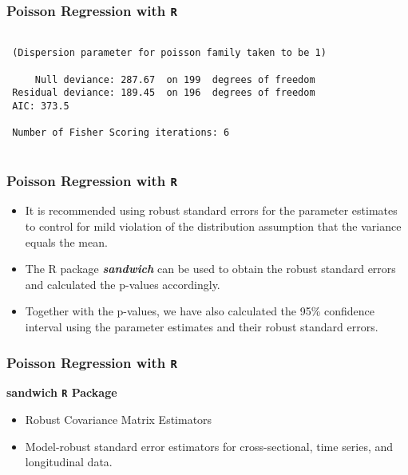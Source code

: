 \documentclass[00-GLMregslides.tex]{subfiles}
\begin{document}
\begin{frame}[fragile]

\frametitle{Poisson Regression with \texttt{R}}
\large
\begin{framed}
\begin{verbatim}

 (Dispersion parameter for poisson family taken to be 1)
 
     Null deviance: 287.67  on 199  degrees of freedom
 Residual deviance: 189.45  on 196  degrees of freedom
 AIC: 373.5
 
 Number of Fisher Scoring iterations: 6
 
 \end{verbatim}
\end{framed}
\end{frame}

\begin{frame}[fragile]

\frametitle{Poisson Regression with \texttt{R}}
\Large 
\begin{itemize}
\item It is recommended using robust standard errors for the parameter estimates to control for mild violation of the distribution assumption that the variance equals the mean. 
\item The  R package \textbf{\textit{sandwich}} can be used to obtain the robust standard errors and calculated the p-values accordingly. 
\item Together with the p-values, we have also calculated the 95\% confidence interval using the parameter estimates and their robust standard errors. 
\end{itemize}
\end{frame}

\begin{frame}[fragile]

\frametitle{Poisson Regression with \texttt{R}}
\large
\textbf{sandwich \texttt{R} Package }
\begin{itemize}
\item Robust Covariance Matrix Estimators
 
\item Model-robust standard error estimators for cross-sectional, time series, and longitudinal data.

\end{itemize}
\end{frame}
\end{document}
